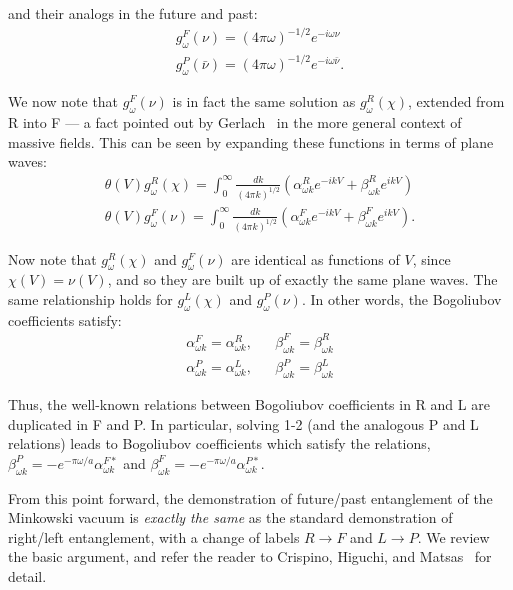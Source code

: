 \documentclass[aps,prl,twocolumn,showpacs]{revtex4}
\begin{document}
and their analogs in the future and past:
\begin{eqnarray*}
g_{\omega}^{F}(\nu) = (4 \pi \omega)^{-1/2} e^{-i \omega \nu} \\
g_{\omega}^{P}(\bar{\nu}) = (4 \pi \omega)^{-1/2} e^{-i \omega \bar{\nu}}.
\end{eqnarray*}

We now note that $g_{\omega}^{F}(\nu)$ is in fact the same solution as $g_{\omega}^{R}(\chi)$, extended from R into F \---- a fact pointed out by Gerlach~\cite{gerlach1, crispino1} in the more general context of massive fields.  This can be seen by expanding these functions in terms of plane waves:
\begin{eqnarray}
 \theta(V) g_{\omega}^{R}(\chi) = \int_{0}^{\infty} \frac{dk}{(4 \pi k)^{1/2}}\left( \alpha^{R}_{\omega k} e^{-ikV} + \beta^{R}_{\omega k} e^{ikV} \right) \\
 \theta(V) g_{\omega}^{F}(\nu) = \int_{0}^{\infty} \frac{dk}{(4 \pi k)^{1/2}}\left( \alpha^{F}_{\omega k} e^{-ikV} + \beta^{F}_{\omega k} e^{ikV} \right) .
\end{eqnarray}

Now note that $g_{\omega}^{R}(\chi)$ and $g_{\omega}^{F}(\nu)$ are identical as functions of $V$, since $\chi(V) = \nu(V)$, and so they are built up of exactly the same plane waves.  The same relationship holds for $g_{\omega}^{L}(\chi)$ and $g_{\omega}^{P}(\nu)$.  In other words, the Bogoliubov coefficients satisfy:
\begin{eqnarray*}
 \alpha^{F}_{\omega k} = \alpha^{R}_{\omega k}, && \beta^{F}_{\omega k} = \beta^{R}_{\omega k} \\
 \alpha^{P}_{\omega k} = \alpha^{L}_{\omega k}, && \beta^{P}_{\omega k} = \beta^{L}_{\omega k}\end{eqnarray*}

Thus, the well-known relations between Bogoliubov coefficients in R and L are duplicated in F and P.  In particular, solving 1-2 (and the analogous P and L relations) leads to Bogoliubov coefficients which satisfy the relations,  $\beta^{P}_{\omega k} = - e^{-\pi \omega / a} \alpha^{F \ast}_{\omega k}$ and $\beta^{F}_{\omega k} = - e^{-\pi \omega / a} \alpha^{P \ast}_{\omega k}$.

From this point forward, the demonstration of future/past entanglement of the Minkowski vacuum is \textit{exactly the same} as the standard demonstration of right/left entanglement, with a change of labels $R \rightarrow F$ and $L \rightarrow P$.  We review the basic argument, and refer the reader to Crispino, Higuchi, and Matsas~\cite{crispino1} for detail.
\end{document}
